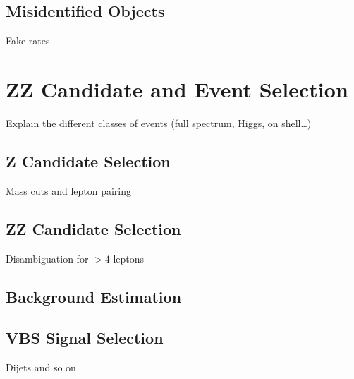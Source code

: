 \subsection{Misidentified Objects}\label{sec:looseID}
Fake rates



\section{ZZ Candidate and Event Selection}
Explain the different classes of events (full spectrum, Higgs, on shell\ldots)

\subsection{Z Candidate Selection}\label{sec:zSelection}
Mass cuts and lepton pairing


\subsection{ZZ Candidate Selection}
Disambiguation for $>4$ leptons


\subsection{Background Estimation}


\subsection{VBS Signal Selection}\label{sec:vbsSelection}
Dijets and so on
